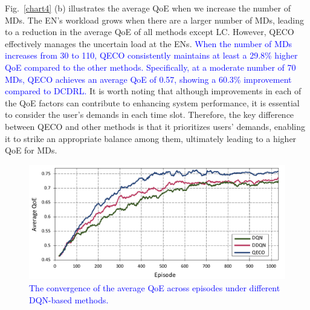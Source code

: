 \documentclass[10pt, journal,letterpaper]{IEEEtran}
\begin{document}
 Fig.~\ref{chart4} (b) illustrates the average QoE when we increase the number of MDs. The EN's workload grows when there are a larger number of MDs, leading to a reduction in the average QoE of all methods except LC. However, QECO effectively manages the uncertain load at the ENs. \textcolor{blue}{When the number of MDs increases from 30 to 110, QECO consistently maintains at least a 29.8\% higher QoE compared to the other methods. Specifically, at a moderate number of 70 MDs, QECO achieves an average QoE of 0.57, showing a 60.3\% improvement compared to DCDRL.} It is worth noting that although improvements in each of the QoE factors can contribute to enhancing system performance, it is essential to consider the user's demands in each time slot. Therefore, the key difference between QECO and other methods is that it prioritizes users' demands, enabling it to strike an appropriate balance among them, ultimately leading to a higher QoE for MDs.

\begin{figure}
	\captionsetup{name=Fig.}
	\centering
	\includegraphics[width=.9\linewidth]{m1}
	\vspace*{-3mm}
	\caption{\textcolor{blue}{The convergence of the average QoE across episodes under different DQN-based methods.
	}}
	\vspace*{-3mm}
	\label{chart01}
\end{figure}



\vspace{-5mm}
\end{document}
